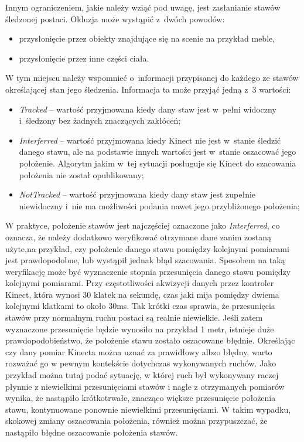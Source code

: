 Innym ograniczeniem, jakie należy wziąć pod uwagę, jest zasłanianie stawów śledzonej postaci. Okluzja może wystąpić z~dwóch powodów:
\begin{itemize}
	\item przysłonięcie przez obiekty znajdujące się na scenie na przykład meble,
	\item przysłonięcie przez inne części ciała.
\end{itemize}
																																			
W tym miejscu należy wspomnieć o~informacji przypisanej do każdego ze stawów określającej stan jego śledzenia. Informacja ta może przyjąć jedną z~3 wartości:
\begin{itemize}
	\item \emph{Tracked} -- wartość przyjmowana kiedy dany staw jest w~pełni widoczny i~śledzony bez żadnych znaczących zakłóceń;
	\item \emph{Interferred} -- wartość przyjmowana kiedy Kinect nie jest w~stanie śledzić danego stawu, ale na podstawie innych wartości jest w~stanie oszacować jego położenie. Algorytm jakim w~tej sytuacji posługuje się Kinect do szacowania położenia nie został opublikowany;
	\item \emph{NotTracked} -- wartość przyjmowana kiedy dany staw jest zupełnie niewidoczny i~nie ma możliwości podania nawet jego przybliżonego położenia;
\end{itemize}
																																			
W praktyce, położenie stawów jest najczęściej oznaczone jako \emph{Interferred}, co oznacza, że należy dodatkowo weryfikować otrzymane dane zanim zostaną użyte,na przykład, czy położenie danego stawu pomiędzy kolejnymi pomiarami jest prawdopodobne, lub wystąpił jednak błąd szacowania. Sposobem na taką weryfikację może być wyznaczenie stopnia przesunięcia danego stawu pomiędzy kolejnymi pomiarami. Przy częstotliwości akwizycji danych przez kontroler Kinect, która wynosi 30 klatek na sekundę, czas jaki mija pomiędzy dwiema kolejnymi klatkami to około 30ms. Tak krótki czas sprawia, że przesunięcia stawów przy normalnym ruchu postaci są realnie niewielkie. Jeśli zatem wyznaczone przesunięcie będzie wynosiło na przykład 1 metr, istnieje duże prawdopodobieństwo, że położenie stawu zostało oszacowane błędnie. Określając czy dany pomiar Kinecta można uznać za prawidłowy albzo błędny, warto rozważać go w pewnym kontekście dotychczas wykonywanych ruchów. Jako przykład można tutaj podać sytuację, w której ruch był wykonywany raczej płynnie z niewielkimi przesunięciami stawów i nagle z otrzymanych pomiarów wynika, że nastąpiło krótkotrwałe, znacząco większe przesunięcie położenia stawu, kontynuowane ponownie niewielkimi przesunięciami. W takim wypadku, skokowej zmiany oszacowania położenia, również można przypuszczać, że nastąpiło błędne oszacowanie położenia stawów.
																																			
